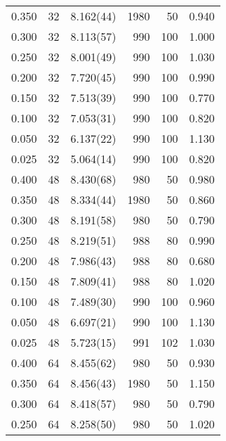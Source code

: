 \begin{tabular}{rrlrrr}
 0.350 &      32 & 8.162(44) &                 1980 &                   50 &    0.940 \\
 0.300 &      32 & 8.113(57) &                  990 &                  100 &    1.000 \\
 0.250 &      32 & 8.001(49) &                  990 &                  100 &    1.030 \\
 0.200 &      32 & 7.720(45) &                  990 &                  100 &    0.990 \\
 0.150 &      32 & 7.513(39) &                  990 &                  100 &    0.770 \\
 0.100 &      32 & 7.053(31) &                  990 &                  100 &    0.820 \\
 0.050 &      32 & 6.137(22) &                  990 &                  100 &    1.130 \\
 0.025 &      32 & 5.064(14) &                  990 &                  100 &    0.820 \\
 0.400 &      48 & 8.430(68) &                  980 &                   50 &    0.980 \\
 0.350 &      48 & 8.334(44) &                 1980 &                   50 &    0.860 \\
 0.300 &      48 & 8.191(58) &                  980 &                   50 &    0.790 \\
 0.250 &      48 & 8.219(51) &                  988 &                   80 &    0.990 \\
 0.200 &      48 & 7.986(43) &                  988 &                   80 &    0.680 \\
 0.150 &      48 & 7.809(41) &                  988 &                   80 &    1.020 \\
 0.100 &      48 & 7.489(30) &                  990 &                  100 &    0.960 \\
 0.050 &      48 & 6.697(21) &                  990 &                  100 &    1.130 \\
 0.025 &      48 & 5.723(15) &                  991 &                  102 &    1.030 \\
 0.400 &      64 & 8.455(62) &                  980 &                   50 &    0.930 \\
 0.350 &      64 & 8.456(43) &                 1980 &                   50 &    1.150 \\
 0.300 &      64 & 8.418(57) &                  980 &                   50 &    0.790 \\
 0.250 &      64 & 8.258(50) &                  980 &                   50 &    1.020 \\

\end{tabular}
